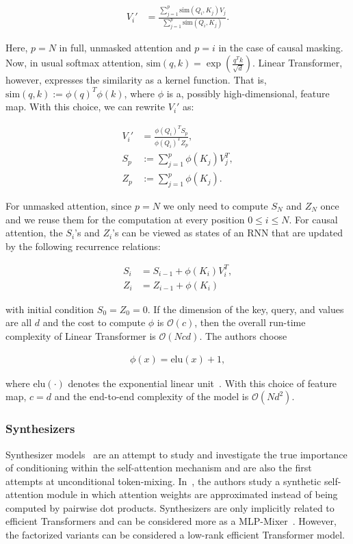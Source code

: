 \begin{align*}
V_i' &= \frac{\sum_{j=1}^p \text{sim}(Q_i, K_j) V_j}{\sum_{j=1}^p \text{sim}(Q_i, K_j)}.
\end{align*}

Here, $p = N$ in full, unmasked attention and $p = i$ in the case of causal masking. Now, in usual softmax attention, $\text{sim}(q, k) = \exp\left(\frac{q^T k}{\sqrt{d}}\right)$. Linear Transformer, however, expresses the similarity as a kernel function. That is, $\text{sim}(q, k) := \phi(q)^T \phi(k)$, where $\phi$ is a, possibly high-dimensional, feature map. With this choice, we can rewrite $V_i'$ as:

\begin{align*}
V_i' &= \frac{\phi(Q_i)^T S_p}{\phi(Q_i)^T Z_p},\\
S_p &:= \sum_{j=1}^p \phi(K_j) V_j^T,\\
Z_p &:= \sum_{j=1}^p \phi(K_j).
\end{align*}

For unmasked attention, since $p = N$ we only need to compute $S_N$ and $Z_N$ once and we reuse them for the computation at every position $0 \leq i \leq N$. For causal attention, the $S_i$'s and $Z_i$'s can be viewed as states of an RNN that are updated by the following recurrence relations:

\begin{align*}
S_i &= S_{i-1} + \phi(K_i)V_i^T,\\
Z_i &= Z_{i-1} + \phi(K_i)
\end{align*}

with initial condition $S_0 = Z_0 = 0$. If the dimension of the key, query, and values are all $d$ and the cost to compute $\phi$ is $\mathcal{O}(c)$, then the overall run-time complexity of Linear Transformer is $\mathcal{O}{(N c d)}$. The authors choose

\begin{align*}
\phi(x) = \text{elu}(x) + 1,
\end{align*}

where $\text{elu}(\cdot)$ denotes the exponential linear unit~\citep{clevert2015fast}. With this choice of feature map, $c = d$ and the end-to-end complexity of the model is $\mathcal{O}(N d^2)$.

\subsubsection{Synthesizers}
Synthesizer models~\citep{tay2020synthesizer} are an attempt to study and investigate the true importance of conditioning within the self-attention mechanism and are also the first attempts at unconditional token-mixing. In~\citet{tay2020synthesizer}, the authors study a synthetic self-attention module in which attention weights are approximated instead of being computed by pairwise dot products. Synthesizers are only implicitly related to efficient Transformers and can be considered more as a MLP-Mixer~\citep{tolstikhin2021mlp}. However, the factorized variants can be considered a low-rank efficient Transformer model. 
